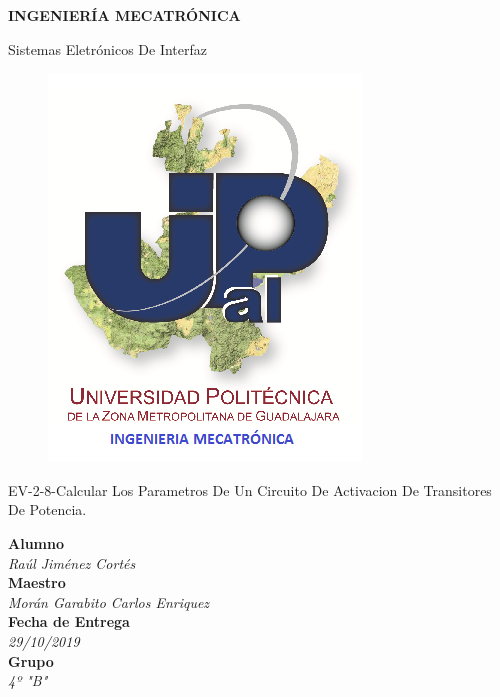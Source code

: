 \documentclass[10pt,a4paper]{article}
\author{Jiménez Cortés Raúl}
\begin{document}
\begin{center}
\begin{LARGE}
\textbf{INGENIERÍA MECATRÓNICA}\\
\end{LARGE}
{\large Sistemas Eletrónicos De Interfaz}\\
\begin{figure}[hbtp]
\centering
\includegraphics[scale=0.80]{UPZMG_Mecatr_nica.png}
\end{figure} 
\begin{center}
\begin{LARGE}
EV-2-8-Calcular Los Parametros De Un Circuito De Activacion De Transitores De Potencia.
\end{LARGE}
\end{center}

\begin{Large}
\textbf{Alumno}
\\\textit{Raúl Jiménez Cortés}
\textbf{\\Maestro}
\\\textit{Morán Garabito Carlos Enriquez}
\textbf{\\Fecha de Entrega}
\\\textit{29/10/2019}
\textbf{\\Grupo}
\\\textit{4º "B"}
\end{Large}
\end{center}

\newpage
\end{document}
